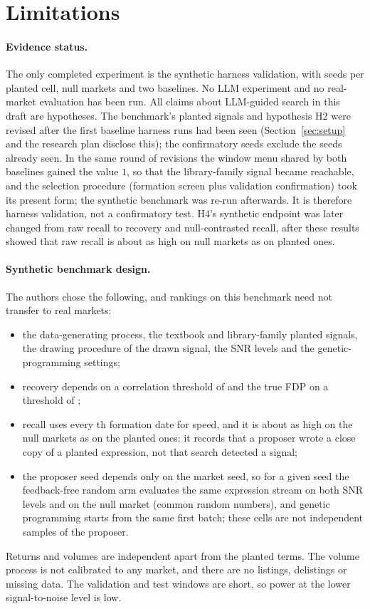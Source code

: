 \section{Limitations}
\label{sec:limitations}

\paragraph{Evidence status.} The only completed experiment is the synthetic
harness validation, with \SynSeeds{} seeds per planted cell, \SynNullSeeds{}
null markets and two baselines. No LLM experiment and no real-market
evaluation has been run. All claims about LLM-guided search in this draft are
hypotheses. The benchmark's planted signals and hypothesis H2 were revised
after the first baseline harness runs had been seen (Section~\ref{sec:setup}
and the research plan disclose this); the confirmatory seeds exclude the
seeds already seen. In the same round of revisions the window menu shared by both
baselines gained the value $1$, so that the library-family signal became
reachable, and the selection procedure (formation screen plus validation
confirmation) took its present form; the synthetic benchmark was re-run
afterwards. It is therefore harness validation, not a confirmatory test.
H4's synthetic endpoint was later changed from raw recall to recovery and
null-contrasted recall, after these results showed that raw recall is about
as high on null markets as on planted ones.

\paragraph{Synthetic benchmark design.} The authors chose the following, and
rankings on this benchmark need not transfer to real markets:
\begin{itemize}
  \item the data-generating process, the textbook and library-family planted
    signals, the drawing procedure of the drawn signal, the SNR levels and
    the genetic-programming settings;
  \item recovery depends on a correlation threshold of
    \SynRecoveryThreshold{} and the true FDP on a threshold of
    \SynTrueDiscoveryThreshold{};
  \item recall uses every \SynRecallStride{}th formation date for speed,
    and it is about as high on the null markets as on the planted ones: it
    records that a proposer wrote a close copy of a planted expression, not
    that search detected a signal;
  \item the proposer seed depends only on the market seed, so for a given
    seed the feedback-free random arm evaluates the same expression stream
    on both SNR levels and on the null market (common random numbers), and
    genetic programming starts from the same first batch; these cells are
    not independent samples of the proposer.
\end{itemize}
Returns and volumes are independent apart from the planted terms. The
volume process is not calibrated to any market, and there are no
listings, delistings or missing data. The validation and test windows are
short, so power at the lower signal-to-noise level is low.

